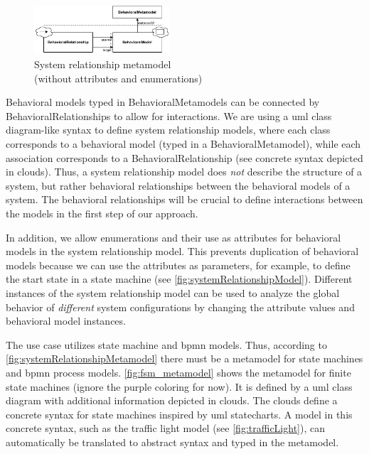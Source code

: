 \documentclass{jot}
\begin{document}
\begin{figure}[h]
    \centering
    \includegraphics[width=0.45\textwidth]{figures/systemRelationshipMetamodel.pdf}
    \caption{System relationship metamodel \\ (without attributes and enumerations)}
    \label{fig:systemRelationshipMetamodel}
\end{figure}

Behavioral models typed in \textsf{BehavioralMetamodel}s can be connected by \textsf{BehavioralRelationship}s to allow for interactions.
We are using a \gls*{uml} class diagram-like syntax to define system relationship models, where each class corresponds to a behavioral model (typed in a \textsf{BehavioralMetamodel}), while each association corresponds to a \textsf{BehavioralRelationship} (see concrete syntax depicted in clouds).
Thus, a system relationship model does \emph{not} describe the structure of a system, but rather behavioral relationships between the behavioral models of a system.
The behavioral relationships will be crucial to define interactions between the models in the first step of our approach.

In addition, we allow enumerations and their use as attributes for behavioral models in the system relationship model.
This prevents duplication of behavioral models because we can use the attributes as parameters, for example, to define the start state in a state machine (see \autoref{fig:systemRelationshipModel}).
Different instances of the system relationship model can be used to analyze the global behavior of \emph{different} system configurations by changing the attribute values and behavioral model instances.

The use case utilizes state machine and \gls*{bpmn} models.
Thus, according to \autoref{fig:systemRelationshipMetamodel} there must be a metamodel for state machines and \gls*{bpmn} process models.
\autoref{fig:fsm_metamodel} shows the metamodel for finite state machines (ignore the purple coloring for now).
It is defined by a \gls*{uml} class diagram with additional information depicted in clouds.
The clouds define a concrete syntax for state machines inspired by \gls*{uml} statecharts.
A model in this concrete syntax, such as the traffic light model (see \autoref{fig:trafficLight}), can automatically be translated to abstract syntax and typed in the metamodel.
\end{document}
